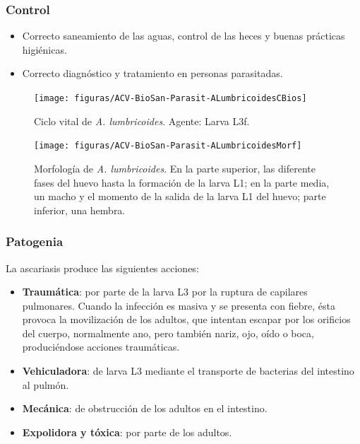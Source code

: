 \subsubsection{Control}
\begin{itemize}[itemsep=0pt,parsep=0pt,topsep=0pt,partopsep=0pt]
	\item Correcto saneamiento de las aguas, control de las heces y buenas prácticas higiénicas.
	\item Correcto diagnóstico y tratamiento en personas parasitadas.
\end{itemize}
\begin{multicols}{2}
	\begin{figure}[H]
		\centering
		\texttt{[image: figuras/ACV-BioSan-Parasit-ALumbricoidesCBios]}
		\caption[Ciclo vital de \textit{A. lumbricoides}]{Ciclo vital de \textit{A. lumbricoides}. Agente: Larva L3f.\label{fig:PARASIT:AlumbricoidesCBios}}
	\end{figure}
	\columnbreak
	\begin{figure}[H]
		\centering
		\texttt{[image: figuras/ACV-BioSan-Parasit-ALumbricoidesMorf]}
		\caption[Morfología de \textit{A. lumbricoides}]{Morfología de \textit{A. lumbricoides}. En la parte superior, las diferente fases del huevo hasta la formación de la larva L1; en la parte media, un macho y el momento de la salida de la larva L1 del huevo; parte inferior, una hembra.\label{fig:PARASIT:AlumbricoidesMorf}}
	\end{figure}
\end{multicols}
\subsubsection{Patogenia}
La ascariasis produce las siguientes acciones:
\begin{itemize}[itemsep=0pt,parsep=0pt,topsep=0pt,partopsep=0pt]
	\item\textbf{Traumática}: por parte de la larva L3 por la ruptura de capilares pulmonares. Cuando la infección es masiva y se presenta con fiebre, ésta provoca la movilización de los adultos, que intentan escapar por los orificios del cuerpo, normalmente ano, pero también nariz, ojo, oído o boca, produciéndose acciones traumáticas.
	\item\textbf{Vehiculadora}: de larva L3 mediante el transporte de bacterias del intestino al pulmón.
	\item\textbf{Mecánica}: de obstrucción de los adultos en el intestino.
	\item\textbf{Expolidora y tóxica}: por parte de los adultos.
\end{itemize}
